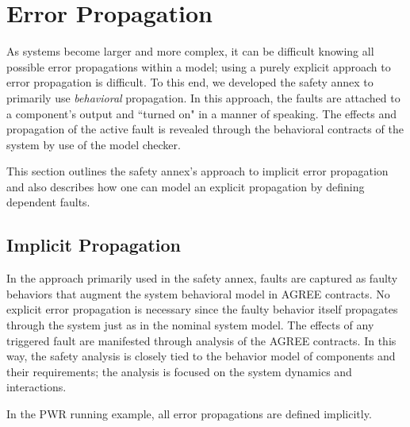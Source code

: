 \section{Error Propagation}
As systems become larger and more complex, it can be difficult knowing all possible error propagations within a model; using a purely explicit approach to error propagation is difficult. To this end, we developed the safety annex to primarily use \textit{behavioral} propagation. In this approach, the faults are attached to a component's output and ``turned on" in a manner of speaking. The effects and propagation of the active fault is revealed through the behavioral contracts of the system by use of the model checker. 

This section outlines the safety annex's approach to implicit error propagation and also describes how one can model an explicit propagation by defining dependent faults. 

\subsection{Implicit Propagation}
In the approach primarily used in the safety annex, faults are captured as faulty behaviors that augment the system behavioral model in AGREE contracts. No explicit error propagation is necessary since the faulty behavior itself propagates through the system just as in the nominal system model. The effects of any triggered fault are manifested through analysis of the AGREE contracts. In this way, the safety analysis is closely tied to the behavior model of components and their requirements; the analysis is focused on the system dynamics and interactions. 

In the PWR running example, all error propagations are defined implicitly. 

